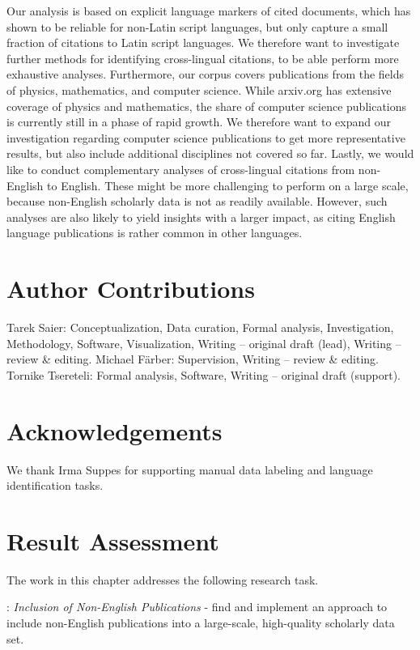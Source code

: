 Our analysis is based on explicit language markers of cited documents, which has shown to be reliable for non-Latin script languages, but only capture a small fraction of citations to Latin script languages. We therefore want to investigate further methods for identifying cross-lingual citations, to be able perform more exhaustive analyses. Furthermore, our corpus covers publications from the fields of physics, mathematics, and computer science. While arxiv.org has extensive coverage of physics and mathematics, the share of computer science publications is currently still in a phase of rapid growth. We therefore want to expand our investigation regarding computer science publications to get more representative results, but also include additional disciplines not covered so far.
Lastly, we would like to conduct complementary analyses of cross-lingual citations from non-English to English. These might be more challenging to perform on a large scale, because non-English scholarly data is not as readily available. However, such analyses are also likely to yield insights with a larger impact, as citing English language publications is rather common in other languages.

\section*{Author Contributions}  %
Tarek Saier: Conceptualization, Data curation, Formal analysis, Investigation, Methodology, Software, Visualization, Writing -- original draft (lead), Writing -- review \& editing. Michael F{\"a}rber: Supervision, Writing -- review \& editing. Tornike Tsereteli: Formal analysis, Software, Writing -- original draft (support).

\section*{Acknowledgements}
We thank Irma Suppes for supporting manual data labeling and language identification tasks.

\section{Result Assessment}
\label{sec:xling-assessment}

The work in this chapter addresses the following research task.

\begin{rtlist}
    \item[\rtmark{3}:] \textit{Inclusion of Non-English Publications} - find and implement an approach to include non-English publications into a large-scale, high-quality scholarly data set.
\end{rtlist}

